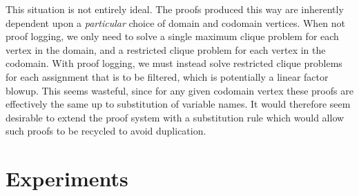 \documentclass{article}
\begin{document}
This situation is not entirely ideal. The proofs produced this way are inherently dependent upon a
\emph{particular} choice of domain and codomain vertices. When not proof logging, we only need to
solve a single maximum clique problem for each vertex in the domain, and a restricted clique problem
for each vertex in the codomain. With proof logging, we must instead solve restricted clique
problems for each assignment that is to be filtered, which is potentially a linear factor blowup.
This seems wasteful, since for any given codomain vertex these proofs are effectively the same up to
substitution of variable names. It would therefore seem desirable to extend the proof system with a
substitution rule which would allow such proofs to be recycled to avoid duplication.

\section{Experiments}
\end{document}
